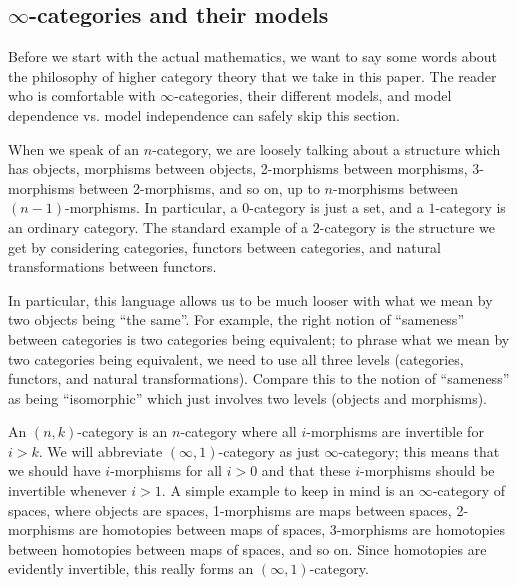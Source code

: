 \documentclass[10pt]{amsart}
\numberwithin{equation}{section}
\theoremstyle{definition}
\begin{document}
	\subsection{$\infty$-categories and their models}\label{subsec:infty-categories_and_their_models}

	Before we start with the actual mathematics, we want to say some words about the philosophy of higher category theory that we take in this paper.
	The reader who is comfortable with $\infty$-categories, their different models, and model dependence vs. model independence can safely skip this section.

	When we speak of an $n$-category, we are loosely talking about a structure which has objects, morphisms between objects, 2-morphisms between morphisms, 3-morphisms between 2-morphisms, and so on, up to $n$-morphisms between $(n-1)$-morphisms.
	In particular, a $0$-category is just a set, and a $1$-category is an ordinary category.
	The standard example of a $2$-category is the structure we get by considering categories, functors between categories, and natural transformations between functors.

	In particular, this language allows us to be much looser with what we mean by two objects being ``the same''.
	For example, the right notion of ``sameness'' between categories is two categories being equivalent; to phrase what we mean by two categories being equivalent, we need to use all three levels (categories, functors, and natural transformations).
	Compare this to the notion of ``sameness'' as being ``isomorphic'' which just involves two levels (objects and morphisms).

	An $(n,k)$-category is an $n$-category where all $i$-morphisms are invertible for $i > k$.
	We will abbreviate $(\infty,1)$-category as just $\infty$-category; this means that we should have $i$-morphisms for all $i > 0$ and that these $i$-morphisms should be invertible whenever $i > 1$.
	A simple example to keep in mind is an $\infty$-category of spaces, where objects are spaces, 1-morphisms are maps between spaces, 2-morphisms are homotopies between maps of spaces, 3-morphisms are homotopies between homotopies between maps of spaces, and so on.
	Since homotopies are evidently invertible, this really forms an $(\infty,1)$-category.
\end{document}
